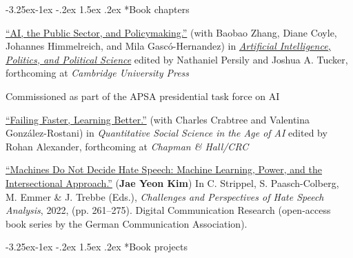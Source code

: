 \documentclass[10pt, letterpaper]{article}
\makeatletter
\renewcommand\subsection{\@startsection{subsection}{2}{\z@}%
  {-3.25ex\@plus -1ex \@minus -.2ex}%
  {1.5ex \@plus .2ex}%
  {\normalfont\large\bfseries\color{cvnavy}}}
\renewenvironment{itemize}{
\begin{list}{}{
        \setlength{\leftmargin}{1.5em}
        \setlength{\itemsep}{0.10em}
        \setlength{\parskip}{0pt}
        \setlength{\parsep}{0.10em}
    }
}{
\end{list}
}
\makeatother
\begin{document}
\subsection*{Book chapters}
\begin{etaremune}

\item \href{https://preprints.apsanet.org/engage/apsa/article-details/69fa21314770e67d929474f3}{``AI, the Public Sector, and Policymaking.''} (with Baobao Zhang, Diane Coyle, Johannes Himmelreich, and Mila Gascó-Hernandez) in \href{https://www.cambridge.org/core/books/artificial-intelligence-politics-and-political-science/374EC2542DFC762DB83B1AFD781C7680#fndtn-information}{\textit{Artificial Intelligence, Politics, and Political Science}} edited by Nathaniel Persily and Joshua A. Tucker, forthcoming at \textit{Cambridge University Press}

\begin{itemize}
    \item Commissioned as part of the APSA presidential task force on AI
\end{itemize}

\item \href{https://rohanalexander.github.io/notes_on_the_future/08-Crabtree_Gonzalez_Rostani_Kim.html}{``Failing Faster, Learning Better.''} (with Charles Crabtree and Valentina González-Rostani) in \textit{Quantitative Social Science in the Age of AI} edited by Rohan Alexander, forthcoming at \textit{Chapman \& Hall/CRC}

\item \href{https://www.ssoar.info/ssoar/handle/document/86424}{``Machines Do Not Decide Hate Speech: Machine Learning, Power, and the Intersectional Approach.''} (\textbf{Jae Yeon Kim}) In C. Strippel, S.
Paasch-Colberg, M. Emmer \& J. Trebbe (Eds.), \textit{Challenges and Perspectives of Hate Speech Analysis}, 2022, (pp. 261--275). Digital Communication Research (open-access book series by the German Communication Association).
\end{etaremune}


\subsection*{Book projects}
\end{document}
